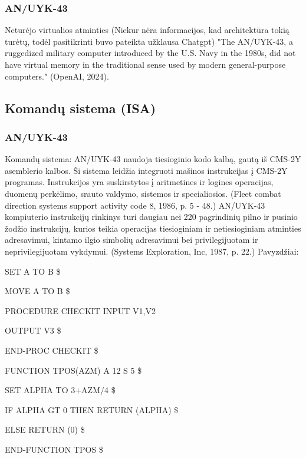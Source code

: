 \documentclass{article}
\begin{document}
\subsubsection{AN/UYK-43}
Neturėjo virtualios atminties (Niekur nėra informacijos, kad architektūra tokią turėtų, todėl pasitikrinti buvo pateikta užklausa Chatgpt) "The AN/UYK-43, a ruggedized military computer introduced by the U.S. Navy in the 1980s, did not have virtual memory in the traditional sense used by modern general-purpose computers." (OpenAI, 2024).
\subsection{Komandų sistema (ISA)}
\subsubsection{AN/UYK-43}
Komandų sistema: AN/UYK-43 naudoja tiesioginio kodo kalbą, gautą iš CMS-2Y asemblerio kalbos. Ši sistema leidžia integruoti mašinos instrukcijas į CMS-2Y programas. Instrukcijos yra suskirstytos į aritmetines ir logines operacijas, duomenų perkėlimo, srauto valdymo, sistemos ir specialiosios. (Fleet combat direction systems support activity code 8, 1986, p. 5 - 48.) AN/UYK-43 kompiuterio instrukcijų rinkinys turi daugiau nei 220 pagrindinių pilno ir pusinio žodžio instrukcijų, kurios teikia operacijas tiesioginiam ir netiesioginiam atminties adresavimui, kintamo ilgio simbolių adresavimui bei privilegijuotam ir neprivilegijuotam vykdymui. (Systems Exploration, Inc, 1987, p. 22.) Pavyzdžiai:
\item SET A TO B \$
\item MOVE A TO B \$
\item PROCEDURE CHECKIT INPUT V1,V2 
\item OUTPUT V3 \$
\item END-PROC CHECKIT \$
\item FUNCTION TPOS(AZM) A 12 S 5 \$
\item SET ALPHA TO 3+AZM/4 \$
\item IF ALPHA GT 0 THEN RETURN (ALPHA) \$
\item ELSE RETURN (0) \$
\item END-FUNCTION TPOS \$
\end{document}
